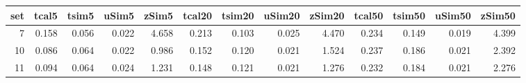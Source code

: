 
\begin{tabular}{r|r|r|r|r|r|r|r|r|r|r|r|r}
\hline
set & tcal5 & tsim5 & uSim5 & zSim5 & tcal20 & tsim20 & uSim20 & zSim20 & tcal50 & tsim50 & uSim50 & zSim50\\
\hline
7 & 0.158 & 0.056 & 0.022 & 4.658 & 0.213 & 0.103 & 0.025 & 4.470 & 0.234 & 0.149 & 0.019 & 4.399\\
\hline
10 & 0.086 & 0.064 & 0.022 & 0.986 & 0.152 & 0.120 & 0.021 & 1.524 & 0.237 & 0.186 & 0.021 & 2.392\\
\hline
11 & 0.094 & 0.064 & 0.024 & 1.231 & 0.148 & 0.121 & 0.021 & 1.276 & 0.232 & 0.184 & 0.021 & 2.276\\
\hline
\end{tabular}
